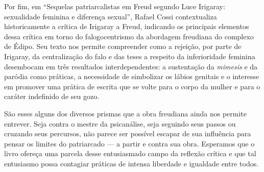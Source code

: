 Por fim, em ``Sequelas patriarcalistas em Freud segundo Luce Irigaray:
sexualidade feminina e diferença sexual'', Rafael Cossi contextualiza
historicamente a crítica de Irigaray a Freud, indicando os principais
elementos dessa crítica em torno do falogocentrismo da abordagem
freudiana do complexo de Édipo. Seu texto nos permite compreender como a
rejeição, por parte de Irigaray, da centralização do falo e das teses a
respeito da inferioridade feminina desembocam em três resultados
interdependentes: a sustentação da \emph{mimesis} e da paródia como
práticas, a necessidade de simbolizar os lábios genitais e o interesse
em promover uma prática de escrita que se volte para o corpo da mulher e
para o caráter indefinido de seu gozo.

São esses alguns dos diversos prismas que a obra freudiana ainda nos
permite entrever. Seja contra o mestre da psicanálise, seja seguindo
seus passos ou cruzando seus percursos, não parece ser possível escapar
de sua influência para pensar os limites do patriarcado --- a partir e
contra sua obra. Esperamos que o livro ofereça uma parcela desse
entusiasmado campo da reflexão crítica e que tal entusiasmo possa
contagiar práticas de intensa liberdade e igualdade entre todos.
